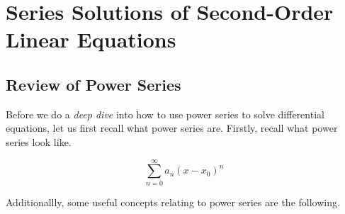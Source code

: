 \chapter{Series Solutions of Second-Order Linear Equations}

\section{Review of Power Series}

Before we do a \textit{deep dive} into how to use power series to solve differential equations,
let us first recall what power series are. Firstly, recall what power series look like.

\[ \sum_{n=0}^\infty a_n {(x - x_0)}^n \]

Additionallly, some useful concepts relating to power series are the following.

